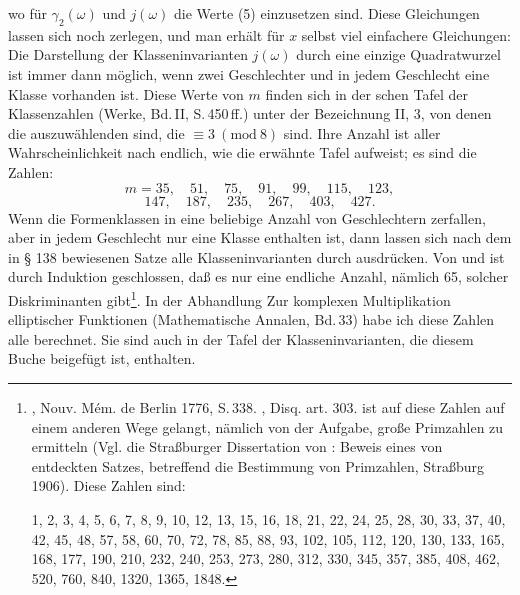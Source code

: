 
wo für $\gamma_2(\omega)$ und $j(\omega)$ die Werte (5) einzusetzen sind. Diese Gleichungen lassen sich noch zerlegen, und man erhält für $x$ selbst viel einfachere Gleichungen:
Die Darstellung der Klasseninvarianten $j(\omega)$ durch eine einzige Quadratwurzel ist immer dann möglich, wenn zwei Geschlechter und in jedem Geschlecht eine Klasse vorhanden ist. Diese Werte von $m$ finden sich in der schen Tafel der Klassenzahlen (Werke, Bd.\,II, S.\,450\,ff.) unter der Bezeichnung II, 3, von denen die auszuwählenden sind, die $\equiv 3\ (\mathrm{mod}\ 8)$ sind. Ihre Anzahl ist aller Wahrscheinlichkeit nach endlich, wie die erwähnte Tafel aufweist; es sind die Zahlen:
\[m = 35, \quad 51, \quad 75, \quad 91, \quad 99, \quad 115, \quad 123,\]
\[147, \quad 187, \quad 235, \quad 267, \quad 403, \quad 427.\]
Wenn die Formenklassen in eine beliebige Anzahl von Geschlechtern zerfallen, aber in jedem Geschlecht nur eine Klasse enthalten ist, dann lassen sich nach dem in § 138 bewiesenen Satze alle Klasseninvarianten durch  ausdrücken. Von  und  ist durch Induktion geschlossen, daß es nur eine endliche Anzahl, nämlich 65, solcher Diskriminanten gibt\footnote{, Nouv. Mém. de Berlin 1776, S.\,338. , Disq. art. 303.  ist auf diese Zahlen auf einem anderen Wege gelangt, nämlich von der Aufgabe, große Primzahlen zu ermitteln (Vgl. die Straßburger Dissertation von : Beweis eines von  entdeckten Satzes, betreffend die Bestimmung von Primzahlen, Straßburg 1906). Diese Zahlen sind:

1, 2, 3, 4, 5, 6, 7, 8, 9, 10, 12, 13, 15, 16, 18, 21, 22, 24, 25, 28, 30, 33, 37, 40, 42, 45, 48, 57, 58, 60, 70, 72, 78, 85, 88, 93, 102, 105, 112, 120, 130, 133, 165, 168, 177, 190, 210, 232, 240, 253, 273, 280, 312, 330, 345, 357, 385, 408, 462, 520, 760, 840, 1320, 1365, 1848.

\par\medskip\noindent\makebox[\linewidth]{\rule{0.25\linewidth}{0.2pt}}}. In der Abhandlung \glqq Zur komplexen Multiplikation elliptischer Funktionen\grqq{} (Mathematische Annalen, Bd.\,33) habe ich diese Zahlen alle berechnet. Sie sind auch in der Tafel der Klasseninvarianten, die diesem Buche beigefügt ist, enthalten.
